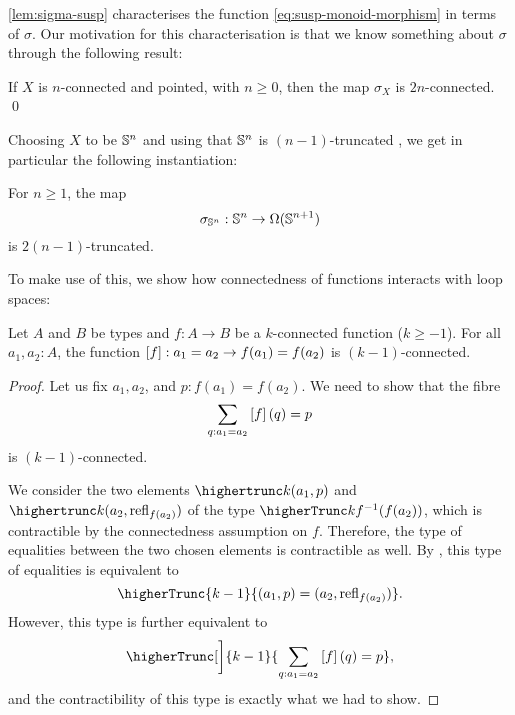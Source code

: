 \documentclass[english,a4paper]{lmcs}
\begin{document}
\cref{lem:sigma-susp} characterises the function \eqref{eq:susp-monoid-morphism}
in terms of $\sigma$.
Our motivation for this characterisation is that we know something about $\sigma$ through the following result:

\begin{thm} \label{thm:freudenthal}
    If $X$ is $n$-connected and pointed, with $n \geq 0$, then the map $\sigma_X$ is $2n$-connected. \qed
\end{thm}


Choosing $X$ to be ${\mathbb S^{n}}$ and using that ${\mathbb S^{n}}$ is $(n-1)$-truncated \cite[Corollary 8.2.2]{HoTT}, we get in particular the following instantiation:


\begin{cor} \label{cor:sigma-truncated}
For $n \geq 1$, the map
\begin{equation}
  \sigma_{{\mathbb S^{n}}} : {\mathbb S^{n}} \to \Omega({\mathbb S^{n+1}})
\end{equation}
is $2(n-1)$-truncated.
\end{cor}


To make use of this, we show how connectedness of functions interacts with loop spaces:

\begin{lem} \label{lem:conn-ap}
    Let $A$ and $B$ be types and $f : A \to B$ be a $k$-connected function ($k \geq -1$).
    For all $a_1, a_2 : A$, the function $\left[{f}\right] : a_1 = a_2 \to f(a_1) = f(a_2)$ is $(k-1)$-connected.
\end{lem}
\begin{proof}
    Let us fix $a_1, a_2$, and $p : f(a_1) = f(a_2)$.
    We need to show that the fibre
    \begin{equation}
      \sum_{q : a_1 = a_2}\left[{f}\right](q) = p
    \end{equation}
    is $(k-1)$-connected.

    We consider the two elements
    $\highertrunc k {(a_1, p)}$
    and
    $\highertrunc k {(a_2, \refl {f(a_2)})}$ of
    the type $\higherTrunc k {f^{-1}(f(a_2))}$, which is contractible by the connectedness assumption on $f$.
    Therefore, the type of equalities between the two chosen elements is contractible as well.
    By \cite[Theorem 7.3.12]{HoTT}, this type of equalities is equivalent to
    \begin{equation} \label{eq:eq-in-truncated-fibre}
    \higherTrunc {k-1} {(a_1, p) = (a_2, \refl {f(a_2)})}.
    \end{equation}
    However,
    this type is further equivalent to
    \begin{equation}
      \higherTrunc[\bigg] {k-1} {\sum_{q : a_1 = a_2} \ap f(q) = p},
    \end{equation}
    and the contractibility of this type is exactly what we had to show.
\end{proof}
\end{document}

